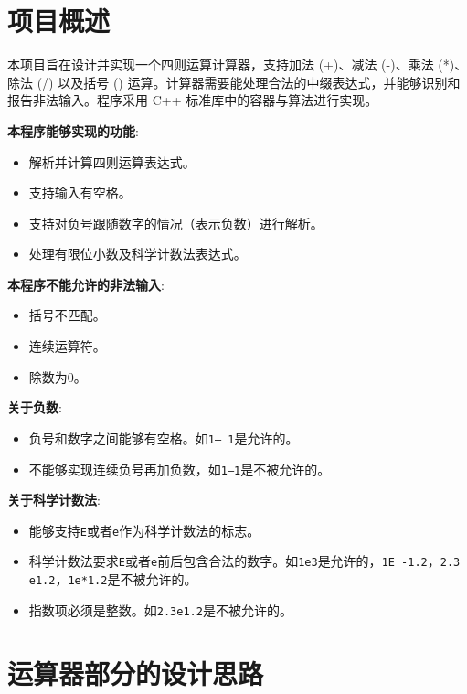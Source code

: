 \documentclass[UTF8]{ctexart}
\begin{document}
\pagestyle{fancy}
\fancyhead{}
\section{项目概述}

本项目旨在设计并实现一个四则运算计算器，支持加法 (+)、减法 (-)、乘法 (*)、除法 (/) 以及括号 () 运算。计算器需要能处理合法的中缀表达式，并能够识别和报告非法输入。程序采用 C++ 标准库中的容器与算法进行实现。

\textbf{本程序能够实现的功能}:
\begin{itemize}
    \item 解析并计算四则运算表达式。
    \item 支持输入有空格。
    \item 支持对负号跟随数字的情况（表示负数）进行解析。
    \item 处理有限位小数及科学计数法表达式。
\end{itemize}

\textbf{本程序不能允许的非法输入}:
\begin{itemize}
    \item 括号不匹配。
    \item 连续运算符。
    \item 除数为0。
\end{itemize}

\textbf{关于负数}:
\begin{itemize}
    \item 负号和数字之间能够有空格。如\texttt{1-- 1}是允许的。
    \item 不能够实现连续负号再加负数，如\texttt{1---1}是不被允许的。
\end{itemize}

\textbf{关于科学计数法}:
\begin{itemize}
    \item 能够支持\texttt{E}或者\texttt{e}作为科学计数法的标志。
    \item 科学计数法要求\texttt{E}或者\texttt{e}前后包含合法的数字。如\texttt{1e3}是允许的，\texttt{1E -1.2}，\texttt{2.3 e1.2}，\texttt{1e*1.2}是不被允许的。
    \item 指数项必须是整数。如\texttt{2.3e1.2}是不被允许的。
\end{itemize}


\section{运算器部分的设计思路}
\end{document}
